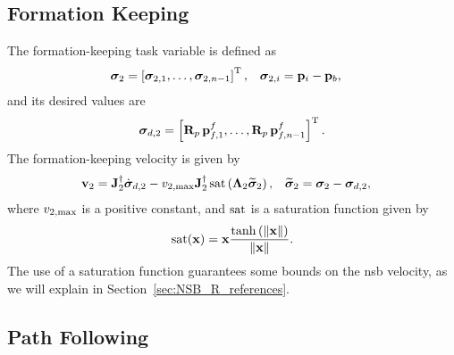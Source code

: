 \subsection{Formation Keeping}
\label{sec:NSB_R_formation}
The formation-keeping task variable is defined as
\begin{align}
    \bm{\sigma}_2 &= \left[\bm{\sigma}_{2,1}, \ldots, \bm{\sigma}_{2,n-1}\right]^{\mathrm{T}}, \label{eq:NSB_R_sigma_2} &
    \bm{\sigma}_{2,i} &= \mathbf{p}_i - \mathbf{p}_b,
\end{align}
and its desired values are 
\begin{equation}
    \bm{\sigma}_{d,2} = \left[\mathbf{R}_p\,\mathbf{p}_{f,1}^f, \ldots, \mathbf{R}_p\,\mathbf{p}_{f,n-1}^f\right]^{\mathrm{T}}  .
    \label{eq:NSB_R_sigma_d_2}
\end{equation}
The formation-keeping velocity is given by 
\begin{align}
    \mathbf{v}_2 &= \mathbf{J}_2^{\dagger}\dot{\bm{\sigma}}_{d,2} - v_{2, \max}\mathbf{J}_2^{\dagger}\,{\rm sat}\left(\bm{\Lambda}_2\widetilde{\bm{\sigma}}_2\right), &
    \widetilde{\bm{\sigma}}_2 &= \bm{\sigma}_2 - \bm{\sigma}_{d, 2},
    \label{eq:NSB_R_v_form}
\end{align}
where $v_{2, \max}$ is a positive constant, and $\rm sat$ is a saturation function given by 
\begin{equation}
    {\rm sat}(\mathbf{x}) = \mathbf{x} \frac{{\rm tanh}\left(\left\|\mathbf{x}\right\|\right)}{\left\|\mathbf{x}\right\|}.
\end{equation}
The use of a saturation function guarantees some bounds on the \gls{nsb} velocity, as we will explain in Section~\ref{sec:NSB_R_references}.

\subsection{Path Following}
\label{sec:NSB_R_LOS}

